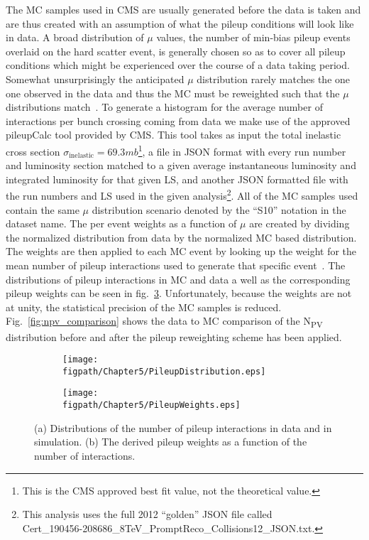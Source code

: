 The MC samples used in CMS are usually generated before the data is taken and are thus created with an assumption of what the pileup conditions will look like in data.
A broad distribution of $\mu$ values, the number of min-bias pileup events overlaid on the hard scatter event, is generally chosen so as to cover all pileup conditions which might be experienced over the course of a data taking period.
Somewhat unsurprisingly the anticipated $\mu$ distribution rarely matches the one one observed in the data and thus the MC must be reweighted such that the $\mu$ distributions match~\cite{PileupStudiesTwiki}.
To generate a histogram for the average number of interactions per bunch crossing coming from data we make use of the approved pileupCalc tool provided by CMS.
This tool takes as input the total inelastic cross section $\sigma_{\text{inelastic}}=69.3\unit{mb}$\footnote{This is the CMS approved best fit value, not the theoretical value.}, a file in JSON format with every run number and luminosity section matched to a given average instantaneous luminosity and integrated luminosity for that given LS, and another JSON formatted file with the run numbers and LS used in the given analysis\footnote{This analysis uses the full 2012 ``golden'' JSON file called\\Cert\_190456-208686\_8TeV\_PromptReco\_Collisions12\_JSON.txt.}.
All of the MC samples used contain the same $\mu$ distribution scenario denoted by the ``S10'' notation in the dataset name.
The per event weights as a function of $\mu$ are created by dividing the normalized distribution from data by the normalized MC based distribution.
The weights are then applied to each MC event by looking up the weight for the mean number of pileup interactions used to generate that specific event~\cite{PileupWeightTwiki}. The distributions of pileup interactions in MC and data a well as the corresponding pileup weights can be seen in fig.~\ref{fig:pileup_reweighting}. Unfortunately, because the weights are not at unity, the statistical precision of the MC samples is reduced.
Fig.~\ref{fig:npv_comparison} shows the data to MC comparison of the N\textsubscript{PV} distribution before and after the pileup reweighting scheme has been applied.

\begin{figure}[!hbt]
    \centering
    \begin{subfigure}[t]{0.48\textwidth}
      \texttt{[image: \\figpath/Chapter5/PileupDistribution.eps]}
      \caption{}
      \label{fig:tnpu_distributions}
    \end{subfigure}
    \begin{subfigure}[t]{0.48\textwidth}
      \texttt{[image: \\figpath/Chapter5/PileupWeights.eps]}
      \caption{}
      \label{fig:pileup_weights}
    \end{subfigure}
    \caption{(a) Distributions of the number of pileup interactions in data and in simulation. (b) The derived pileup weights as a function of the number of interactions.}
    \label{fig:pileup_reweighting}
\end{figure}

